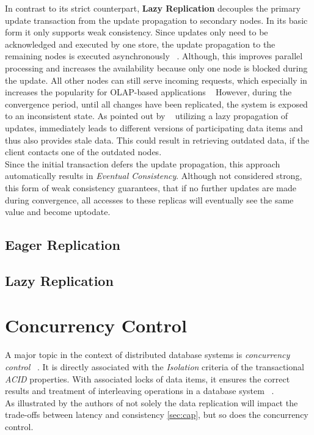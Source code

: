 In contrast to its strict counterpart, \textbf{Lazy Replication} decouples the primary update transaction from the update propagation to secondary nodes.
In its basic form it only supports weak consistency. Since updates only need to be acknowledged and executed by one store, 
the update propagation to the remaining nodes is executed asynchronously ~\cite{fekete:2018}.
Although, this improves parallel processing and increases the availability because only one node is blocked during the update. All other nodes can still serve incoming requests,
which especially in increases the popularity for OLAP-based applications ~\cite{daudjee:2006}
However, during the convergence period, until all changes have been replicated, the system is exposed to an inconsistent state.
As pointed out by ~\cite{cho:2000} utilizing a lazy propagation of updates, immediately leads to different versions of participating data items and thus also provides stale data.
This could result in retrieving outdated data, if the client contacts one of the outdated nodes.
\\
Since the initial transaction defers the update propagation, this approach automatically results in \emph{Eventual Consistency}.
Although not considered strong, this form of weak consistency guarantees, that if no further updates are made 
during convergence, all accesses to these replicas will eventually see the same value and become uptodate. ~\cite{quorums:2003}


\subsection{Eager Replication}
\subsection{Lazy Replication}




\section{Concurrency Control}
\label{sec:concurrency_control}

A major topic in the context of distributed database systems is \emph{concurrency control} ~\cite{bernstein:1981}.
It is directly associated with the \emph{Isolation} criteria of the transactional \emph{ACID} properties.
With associated locks of data items, it ensures the correct results and treatment of interleaving operations in a database system ~\cite{bernstein:1986}.
\\
As illustrated by the authors of \cite{} not solely the data replication will impact the trade-offs between latency and consistency \ref{sec:cap},
but so does the concurrency control.\\

